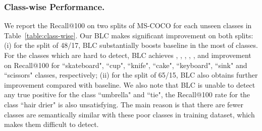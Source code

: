 \documentclass[runningheads]{llncs}
\begin{document}
\subsubsection{Class-wise Performance.}
We report the Recall@100 on two splits of MS-COCO for each unseen classes in Table~\ref{table:class-wise}. Our BLC makes significant improvement on both splits: (i) for the split of 48/17, BLC substantially boosts baseline in the most of classes. For the classes which are hard to detect, BLC achieves , , , , ,  and  improvement on Recall@100 for ``skateboard", ``cup", ``knife", ``cake", ``keyboard", ``sink" and ``scissors" classes, respectively; (ii) for the split of 65/15, BLC also obtains further improvement compared with baseline. We also note that BLC is unable to detect any true positive for the class ``umbrella" and ``tie", the Recall@100 rate for the class ``hair drier" is also unsatisfying. The main reason is that there are fewer classes are semantically similar with these poor classes in training dataset, which makes them difficult to detect.
\setlength{\tabcolsep}{4pt}
\end{document}
